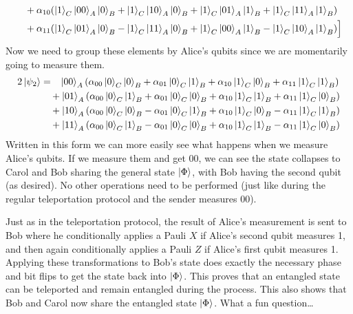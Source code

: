 \documentclass[boxes,pages]{homework}
\begin{document}
\begin{solution}
\begin{align*}
		             & \quad + \alpha_{10}\qty(\ket{1}_C\ket{00}_A\ket{0}_B + \ket{1}_C\ket{10}_A\ket{0}_B + \ket{1}_C\ket{01}_A\ket{1}_B + \ket{1}_C\ket{11}_A\ket{1}_B)           \\
		             & \quad + \alpha_{11}\qty(\ket{1}_C\ket{01}_A\ket{0}_B - \ket{1}_C\ket{11}_A\ket{0}_B + \ket{1}_C\ket{00}_A\ket{1}_B - \ket{1}_C\ket{10}_A\ket{1}_B)\Big]
	\end{align*}
	Now we need to group these elements by Alice's qubits since we are momentarily going to measure them.
	\begin{align*}
		2\ket{\psi_2} & = \phantom{+}\!\ket{00}_A\qty(\alpha_{00}\ket{0}_C\ket{0}_B + \alpha_{01}\ket{0}_C\ket{1}_B + \alpha_{10}\ket{1}_C\ket{0}_B + \alpha_{11}\ket{1}_C\ket{1}_B) \\
		              & \quad + \ket{01}_A\qty(\alpha_{00}\ket{0}_C\ket{1}_B + \alpha_{01}\ket{0}_C\ket{0}_B + \alpha_{10}\ket{1}_C\ket{1}_B + \alpha_{11}\ket{1}_C\ket{0}_B)        \\
		              & \quad + \ket{10}_A\qty(\alpha_{00}\ket{0}_C\ket{0}_B - \alpha_{01}\ket{0}_C\ket{1}_B + \alpha_{10}\ket{1}_C\ket{0}_B - \alpha_{11}\ket{1}_C\ket{1}_B)        \\
		              & \quad + \ket{11}_A\qty(\alpha_{00}\ket{0}_C\ket{1}_B - \alpha_{01}\ket{0}_C\ket{0}_B + \alpha_{10}\ket{1}_C\ket{1}_B - \alpha_{11}\ket{1}_C\ket{0}_B)
	\end{align*}
	Written in this form we can more easily see what happens when we measure Alice's qubits. If we measure them and get 00, we can see the state collapses to Carol and Bob sharing the general state $\ket{\Phi}$, with Bob having the second qubit (as desired). No other operations need to be performed (just like during the regular teleportation protocol and the sender measures 00).

	Just as in the teleportation protocol, the result of Alice's measurement is sent to Bob where he conditionally applies a Pauli $X$ if Alice's second qubit measures 1, and then again conditionally applies a Pauli $Z$ if Alice's first qubit measures 1. Applying these transformations to Bob's state does exactly the necessary phase and bit flips to get the state back into $\ket{\Phi}$. This proves that an entangled state can be teleported and remain entangled during the process. This also shows that Bob and Carol now share the entangled state $\ket{\Phi}$. What a fun question\dots
\end{solution}
\end{document}
